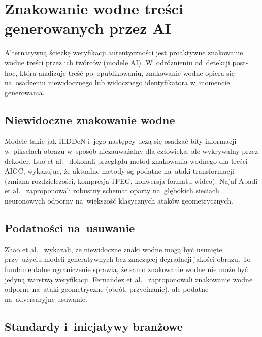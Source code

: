 \section{Znakowanie wodne tre\'{s}ci generowanych przez AI}
\label{sec:watermarking}

Alternatywną ścieżkę weryfikacji autentyczności
jest proaktywne znakowanie wodne treści przez ich twórców
(modele AI). W~odróżnieniu od~detekcji post-hoc, która analizuje
treść po~opublikowaniu, znakowanie wodne opiera się na~osadzeniu
niewidocznego lub widocznego identyfikatora w~momencie generowania.

\subsection{Niewidoczne znakowanie wodne}

Modele takie jak HiDDeN \cite{Zhu2018HiDDeN}
i~jego nast\k{e}pcy ucz\k{a} si\k{e} osadza\'{c} bity informacji w~pikselach obrazu
w~spos\'{o}b niezauwa\.{z}alny dla cz\l{}owieka, ale wykrywalny przez dekoder.
Luo et al.\ \cite{Luo2025WatermarkingAIGC} dokonali przegl\k{a}du metod
znakowania wodnego dla tre\'{s}ci AIGC, wykazuj\k{a}c,
\.{z}e aktualne metody s\k{a} podatne na~ataki transformacji (zmiana rozdzielczo\'{s}ci,
kompresja JPEG, konwersja formatu wideo).
Najaf-Abadi et al.\ \cite{NajafAbadi2024RobustWatermark} zaproponowali
robustny schemat oparty na~g\l{}\k{e}bokich sieciach neuronowych odporny na~wi\k{e}kszo\'{s}\'{c}
klasycznych atak\'{o}w geometrycznych.

\subsection{Podatno\'{s}ci na~usuwanie}

Zhao et al.\ \cite{Zhao2023InvisibleRemovable} wykazali,
\.{z}e niewidoczne znaki wodne mog\k{a} by\'{c} usuni\k{e}te
przy~u\.{z}yciu modeli generatywnych bez znacz\k{a}cej degradacji jako\'{s}ci obrazu.
To fundamentalne ograniczenie sprawia, \.{z}e samo znakowanie wodne
nie mo\.{z}e by\'{c} jedyn\k{a} warstw\k{a} weryfikacji.
Fernandez et al.\ \cite{Fernandez2024BlindWatermark} zaproponowali
znakowanie wodne odporne na~ataki geometryczne (obr\'{o}t, przycinanie),
ale podatne na~adversaryjne usuwanie.

\subsection{Standardy i~inicjatywy bran\.{z}owe}


